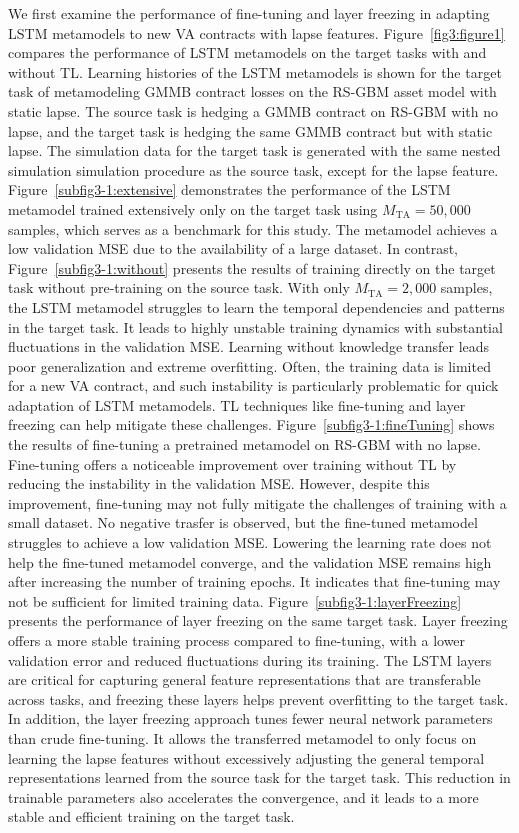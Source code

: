 We first examine the performance of fine-tuning and layer freezing in adapting LSTM metamodels to new VA contracts with lapse features.
Figure~\ref{fig3:figure1} compares the performance of LSTM metamodels on the target tasks with and without TL.
Learning histories of the LSTM metamodels is shown for the target task of metamodeling GMMB contract losses on the RS-GBM asset model with static lapse.
The source task is hedging a GMMB contract on RS-GBM with no lapse, and the target task is hedging the same GMMB contract but with static lapse.
The simulation data for the target task is generated with the same nested simulation simulation procedure as the source task, except for the lapse feature.
Figure~\ref{subfig3-1:extensive} demonstrates the performance of the LSTM metamodel trained extensively only on the target task using $M_{\text{TA}} = 50,\!000$ samples, which serves as a benchmark for this study. 
The metamodel achieves a low validation MSE due to the availability of a large dataset.
In contrast, Figure~\ref{subfig3-1:without} presents the results of training directly on the target task without pre-training on the source task.
With only $M_{\text{TA}} = 2,\!000$ samples, the LSTM metamodel struggles to learn the temporal dependencies and patterns in the target task.
It leads to highly unstable training dynamics with substantial fluctuations in the validation MSE.
Learning without knowledge transfer leads poor generalization and extreme overfitting. 
Often, the training data is limited for a new VA contract, and such instability is particularly problematic for quick adaptation of LSTM metamodels.
TL techniques like fine-tuning and layer freezing can help mitigate these challenges.
Figure~\ref{subfig3-1:fineTuning} shows the results of fine-tuning a pretrained metamodel on RS-GBM with no lapse.
Fine-tuning offers a noticeable improvement over training without TL by reducing the instability in the validation MSE. 
However, despite this improvement, fine-tuning may not fully mitigate the challenges of training with a small dataset.
No negative trasfer is observed, but the fine-tuned metamodel struggles to achieve a low validation MSE.
Lowering the learning rate does not help the fine-tuned metamodel converge, and the validation MSE remains high after increasing the number of training epochs.
It indicates that fine-tuning may not be sufficient for limited training data.
Figure~\ref{subfig3-1:layerFreezing} presents the performance of layer freezing on the same target task.
Layer freezing offers a more stable training process compared to fine-tuning, with a lower validation error and reduced fluctuations during its training.
The LSTM layers are critical for capturing general feature representations that are transferable across tasks, and freezing these layers helps prevent overfitting to the target task.
In addition, the layer freezing approach tunes fewer neural network parameters than crude fine-tuning.
It allows the transferred metamodel to only focus on learning the lapse features without excessively adjusting the general temporal representations learned from the source task for the target task.
This reduction in trainable parameters also accelerates the convergence, and it leads to a more stable and efficient training on the target task.

